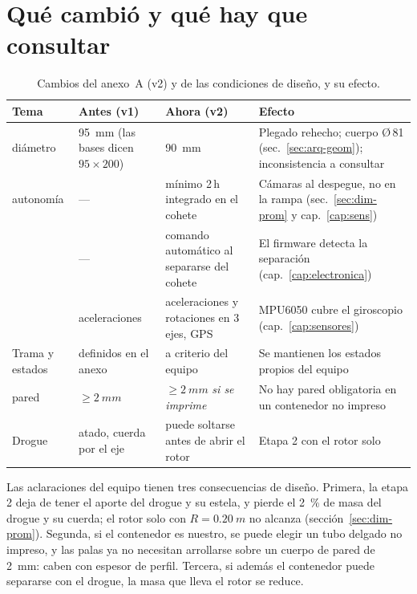 \section{Qué cambió y qué hay que consultar}\label{sec:arq-cambios}

\begin{table}[H]
\centering\small
\caption{Cambios del anexo~A (v2) y de las condiciones de diseño, y su efecto.}\label{tab:arq-cambios}
\begin{tabularx}{\textwidth}{@{}lYYY@{}}
\toprule
\textbf{Tema} & \textbf{Antes (v1)} & \textbf{Ahora (v2)} & \textbf{Efecto}\\\midrule
{} diámetro & \SI{95}{mm} (las bases dicen $95\times200$) & \SI{90}{mm} & Plegado rehecho; cuerpo Ø\,81 (sec.~\ref{sec:arq-geom}); inconsistencia a consultar\\
 autonomía & --- & mínimo 2\,h integrado en el cohete & Cámaras al despegue, no en la rampa (sec.~\ref{sec:dim-prom} y cap.~\ref{cap:sens})\\
 & --- & comando automático al separarse del cohete & El firmware detecta la separación (cap.~\ref{cap:electronica})\\
 & aceleraciones & aceleraciones y rotaciones en 3 ejes, GPS & MPU6050 cubre el giroscopio (cap.~\ref{cap:sensores})\\
Trama y estados & definidos en el anexo & a criterio del equipo & Se mantienen los estados propios del equipo\\
 pared & $\ge\SI{2}{mm}$ & $\ge\SI{2}{mm}$ \emph{si se imprime} & No hay pared obligatoria en un contenedor no impreso\\
Drogue & atado, cuerda por el eje & puede soltarse antes de abrir el rotor & Etapa 2 con el rotor solo\\
\bottomrule
\end{tabularx}
\end{table}

Las aclaraciones del equipo tienen tres consecuencias de diseño. Primera, la etapa 2 deja de
tener el aporte del drogue y su estela, y pierde el \SI{2}{\percent} de masa del drogue y
su cuerda; el rotor solo con $R=\SI{0.20}{m}$ no alcanza (sección~\ref{sec:dim-prom}). Segunda, si
el contenedor es nuestro, se puede elegir un tubo delgado no impreso, y las palas ya no
necesitan arrollarse sobre un cuerpo de pared de \SI{2}{mm}: caben con espesor de
perfil. Tercera, si además el contenedor puede separarse con el drogue, la masa que lleva
el rotor se reduce.

